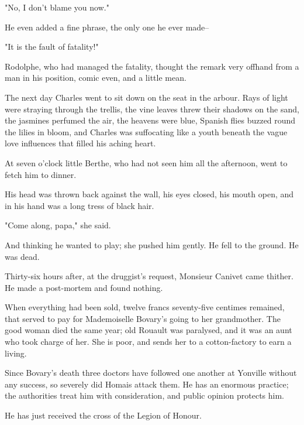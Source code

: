 \documentclass[11pt,twocolumn]{ltugboat}
\begin{document}
"No, I don't blame you now."

He even added a fine phrase, the only one he ever made--

"It is the fault of fatality!"

Rodolphe, who had managed the fatality, thought the remark very offhand
from a man in his position, comic even, and a little mean.

The next day Charles went to sit down on the seat in the arbour. Rays
of light were straying through the trellis, the vine leaves threw their
shadows on the sand, the jasmines perfumed the air, the heavens were
blue, Spanish flies buzzed round the lilies in bloom, and Charles was
suffocating like a youth beneath the vague love influences that filled
his aching heart.

At seven o'clock little Berthe, who had not seen him all the afternoon,
went to fetch him to dinner.

His head was thrown back against the wall, his eyes closed, his mouth
open, and in his hand was a long tress of black hair.

"Come along, papa," she said.

And thinking he wanted to play; she pushed him gently. He fell to the
ground. He was dead.

Thirty-six hours after, at the druggist's request, Monsieur Canivet came
thither. He made a post-mortem and found nothing.

When everything had been sold, twelve francs seventy-five centimes
remained, that served to pay for Mademoiselle Bovary's going to
her grandmother. The good woman died the same year; old Rouault was
paralysed, and it was an aunt who took charge of her. She is poor, and
sends her to a cotton-factory to earn a living.

Since Bovary's death three doctors have followed one another at Yonville
without any success, so severely did Homais attack them. He has an
enormous practice; the authorities treat him with consideration, and
public opinion protects him.

He has just received the cross of the Legion of Honour.
\end{document}

